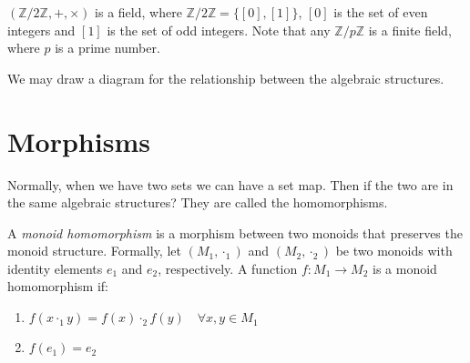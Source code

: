 \documentclass[
	11pt, %
	fleqn, %
	a4paper, %
]{LegrandOrangeBook}
\newcommand{\Z}{\mathbb{Z}} %
\begin{document}
\begin{example}
    $(\Z/2\Z, +, \times)$ is a field, where $\Z/2\Z = \{[0], [1]\}$, $[0]$ is the set of even integers and $[1]$ is the set of odd integers. Note that any $\Z/p\Z$ is a finite field, where $p$ is a prime number.
\end{example}

We may draw a diagram for the relationship between the algebraic structures.

\begin{center}
\end{center}

\newpage

\section{Morphisms}

Normally, when we have two sets we can have a set map. Then if the two are in the same algebraic structures? They are called the homomorphisms.

\begin{definition}
    A \emph{monoid homomorphism} is a morphism between two monoids that preserves the monoid structure. Formally, let $(M_1, \cdot_1)$ and $(M_2, \cdot_2)$ be two monoids with identity elements $e_1$ and $e_2$, respectively. A function $f: M_1 \to M_2$ is a monoid homomorphism if:
    \begin{enumerate}
        \item $f(x \cdot_1 y) = f(x) \cdot_2 f(y) \quad \forall x, y \in M_1$
        \item $f(e_1) = e_2$
    \end{enumerate}
\end{definition}
\end{document}
